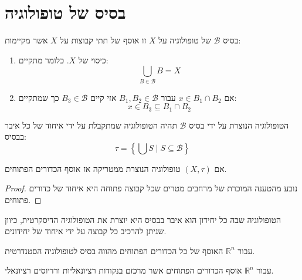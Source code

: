 \documentclass{tstextbook}
\begin{document}
\section{בסיס של טופולוגיה}

\begin{definition}
בסיס \(\mathcal{B}\) של טופולוגיה על \(X\) זו אוסף של תתי קבוצות על \(X\) אשר מקיימות:

  \begin{enumerate}
    \item כיסוי של \(X\). כלומר מתקיים: 
$$\bigcup_{B\in{\mathcal{B}}}B=X$$


    \item אם \(x \in B_{1}\cap B_{2}\) עבור \(B_{1},B_{2}\in \mathcal{B}\) אזי קיים \(B_{3} \in \mathcal{B}\) כך שמתקיים: 
$$x\in B_{3}\subseteq B_{1}\cap B_{2}$$


  \end{enumerate}
\end{definition}
\begin{definition}
הטופולוגיה הנוצרת על ידי בסיס \(\mathcal{B}\) תהיה הטופולוגיה שמתקבלת על ידי איחוד של כל איבר בבסיס:
$$\tau=\left\{\bigcup S\mid S\subseteq\mathcal{B}\right\}$$

\end{definition}
\begin{proposition}
אם \(\left( X,\tau \right)\) טופולוגיה הנוצרת ממטריקה אז אוסף הכדורים הפתוחים.

\end{proposition}
\begin{proof}
נובע מהטענה המוכרת של מרחבים מטרים שכל קבוצה פתוחה היא איחוד של כדורים פתוחים.

\end{proof}
\begin{example}
הטופולוגיה שבה כל יחידון הוא איבר בבסיס היא יוצרת את הטופולוגיה הדיסקרטית, כיוון שניתן להרכיב כל קבוצה על ידי איחוד של יחידונים.

\end{example}
\begin{example}
עבור \(\mathbb{R}^{n}\) האוסף של כל הכדורים הפתוחים מהווה בסיס לטופולוגיה הסטנדרטית.

\end{example}
\begin{example}
עבור \(\mathbb{R}^{n}\) אוסף הכדורים הפתוחים אשר מרכזם בנקודות רציונאליות ורדיוסים רציונאלי.

\end{example}
\end{document}
